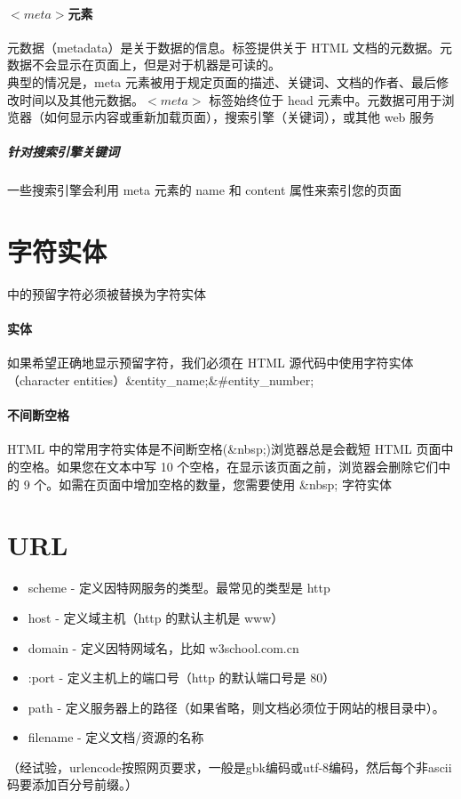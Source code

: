 \documentclass[10pt,UTF8]{ctexart}
\begin{document}
\paragraph{$<meta>$元素} 元数据（metadata）是关于数据的信息。标签提供关于 HTML 文档的元数据。元数据不会显示在页面上，但是对于机器是可读的。\\
典型的情况是，meta 元素被用于规定页面的描述、关键词、文档的作者、最后修改时间以及其他元数据。$<meta>$ 标签始终位于 head 元素中。元数据可用于浏览器（如何显示内容或重新加载页面），搜索引擎（关键词），或其他 web 服务
\subparagraph{针对搜索引擎关键词} 一些搜索引擎会利用 meta 元素的 name 和 content 属性来索引您的页面

\section{字符实体}
中的预留字符必须被替换为字符实体
\paragraph{实体}如果希望正确地显示预留字符，我们必须在 HTML 源代码中使用字符实体（character entities）\&entity\_name;\&\#entity\_number;
\paragraph{不间断空格}HTML 中的常用字符实体是不间断空格(\&nbsp;)浏览器总是会截短 HTML 页面中的空格。如果您在文本中写 10 个空格，在显示该页面之前，浏览器会删除它们中的 9 个。如需在页面中增加空格的数量，您需要使用 \&nbsp; 字符实体

\section{URL}
\begin{itemize}
\item scheme - 定义因特网服务的类型。最常见的类型是 http
\item host - 定义域主机（http 的默认主机是 www）
\item domain - 定义因特网域名，比如 w3school.com.cn
\item :port - 定义主机上的端口号（http 的默认端口号是 80）
\item path - 定义服务器上的路径（如果省略，则文档必须位于网站的根目录中）。
\item filename - 定义文档/资源的名称
\end{itemize}
（经试验，urlencode按照网页要求，一般是gbk编码或utf-8编码，然后每个非ascii码要添加百分号前缀。）
\end{document}
